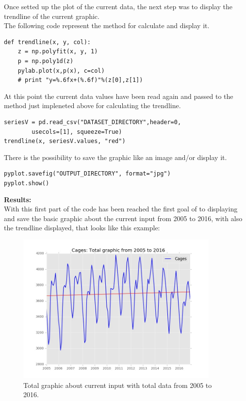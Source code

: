 Once setted up the plot of the current data, the next step was to display the trendline of the current graphic. \\ 
The following code represent the method for calculate and display it.
\begin{lstlisting}
def trendline(x, y, col):
	z = np.polyfit(x, y, 1)
	p = np.poly1d(z)
	pylab.plot(x,p(x), c=col)
	# print "y=%.6fx+(%.6f)"%(z[0],z[1])
\end{lstlisting}	

At this point the current data values have been read again and passed to the method just impleneted above for calculating the trendline.
\begin{lstlisting}
seriesV = pd.read_csv("DATASET_DIRECTORY",header=0, 
		usecols=[1], squeeze=True)
trendline(x, seriesV.values, "red")
\end{lstlisting}

There is the possibility to save the graphic like an image and/or display it.
\begin{lstlisting}
pyplot.savefig("OUTPUT_DIRECTORY", format="jpg")
pyplot.show()
\end{lstlisting}

\begin{minipage}{0.5\textwidth}
\textbf{Results:} \\
With this first part of the code has been reached the first goal of to displaying and save the basic graphic about the current input from 2005 to 2016, with also the trendline displayed, that looks like this example:
\end{minipage} \hfill
\begin{minipage}{0.45\textwidth}
\begin{figure}[H]
\includegraphics[width=0.9\textwidth]{Files/Cages_Total.jpg}
\caption{Total graphic about current input with total data from 2005 to 2016.}
\end{figure}
\end{minipage}


